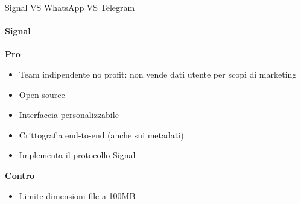\begin{frame}{Signal VS WhatsApp VS Telegram}
    \framesubtitle{Signal}
    
    \textbf{Pro}
    \begin{itemize}
        \item Team indipendente no profit: non vende dati utente per scopi di marketing
        \item Open-source
        \item Interfaccia personalizzabile
        \item Crittografia end-to-end (anche sui metadati)
        \item Implementa il protocollo Signal
    \end{itemize}\pause

    \textbf{Contro}
    \begin{itemize}
        \item Limite dimensioni file a 100MB
    \end{itemize}

\end{frame}

